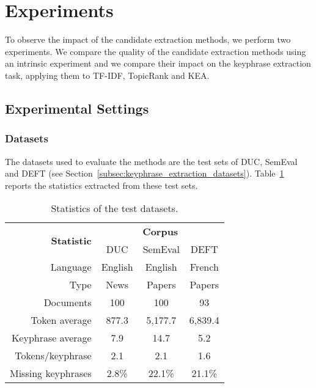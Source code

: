 \section{Experiments}
\label{sec:evaluation}
  To observe the impact of the candidate extraction methods, we perform two
  experiments. We compare the quality of the candidate extraction methods using
  an intrinsic experiment and we compare their impact on the keyphrase
  extraction task, applying them to TF-IDF, TopicRank and KEA.

  \subsection{Experimental Settings}
  \label{subsec:evaluation_settings}
    \subsubsection{Datasets}
    \label{subsubsec:datasets}
      The datasets used to evaluate the methods are the test sets of DUC,
      SemEval and DEFT (see Section~\ref{subsec:keyphrase_extraction_datasets}).
      Table~\ref{tab:test_dataset_statistics} reports the statistics extracted
      from these test sets.
      \begin{table}
        \centering
        \begin{tabular}{@{~}r@{~}c@{~}c@{~}c@{~}}
          \toprule
          \multirow{2}{*}[-2pt]{\textbf{Statistic}} & \multicolumn{3}{c}{\textbf{Corpus}}\\
          \cmidrule{2-4}
          & DUC & SemEval & DEFT\\
          \midrule
          Language & English & English & French\\
          Type & News & Papers & Papers\\
          Documents & 100 & 100 & 93\\
          Token average & 877.3 & 5,177.7 & 6,839.4\\
          Keyphrase average & 7.9 & 14.7 & 5.2\\
          Tokens/keyphrase & 2.1 & 2.1 & 1.6\\
          Missing keyphrases & 2.8\% & 22.1\% & 21.1\% \\
          \bottomrule
        \end{tabular}
        \caption{Statistics of the test datasets.
                 \label{tab:test_dataset_statistics}}
      \end{table}

